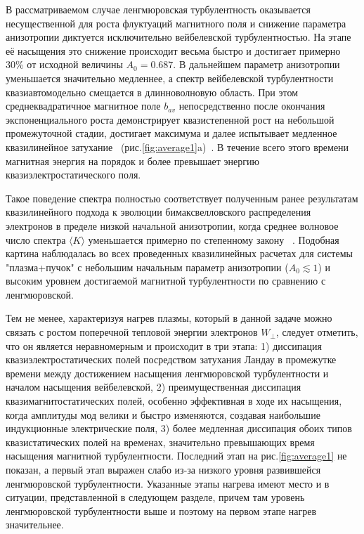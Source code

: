 В рассматриваемом случае ленгмюровская турбулентность оказывается несущественной для роста флуктуаций магнитного поля и снижение параметра анизотропии диктуется исключительно вейбелевской турбулентностью. На этапе её насыщения это снижение происходит весьма быстро и достигает примерно 30\% от исходной величины $A_0=0.687$. В дальнейшем параметр анизотропии уменьшается значительно медленнее, а спектр вейбелевской турбулентности квазиавтомодельно смещается в длинноволновую область. При этом среднеквадратичное магнитное поле $b_{av}$ непосредственно после окончания экспоненциального роста демонстрирует квазистепенной рост на небольшой    промежуточной стадии, достигает максимума и далее испытывает медленное квазилинейное затухание ~(рис.\ref{fig:average1}a)~\cite{Kuznetsov2023}. В течение всего этого времени магнитная энергия на порядок и более превышает энергию квазиэлектростатического поля.

Такое поведение спектра полностью соответствует полученным ранее результатам квазилинейного подхода к эволюции бимаксвелловского распределения электронов в пределе низкой начальной анизотропии, когда среднее волновое число спектра $\langle K\rangle$ уменьшается примерно по степенному закону~\cite{Kuznetsov2023,Borodachev2016_Radiofiz} . Подобная картина наблюдалась во всех проведенных квазилинейных расчетах для системы "плазма+пучок" с небольшим начальным параметр анизотропии ($A_0\lesssim1$) и высоким уровнем достигаемой магнитной турбулентности по сравнению с ленгмюровской. 

Тем не менее, характеризуя нагрев плазмы, который в данной задаче можно связать с ростом поперечной тепловой энергии электронов $W_\perp$, следует отметить, что он является неравномерным и происходит в три этапа: 1) диссипация квазиэлектростатических полей посредством затухания Ландау в промежутке времени между достижением насыщения ленгмюровской турбулентности и началом насыщения вейбелевской, 2) преимущественная диссипация квазимагнитостатических полей, особенно эффективная в ходе их насыщения, когда амплитуды мод велики и быстро изменяются, создавая наибольшие индукционные электрические поля, 3) более медленная диссипация обоих типов квазистатических полей на временах, значительно превышающих время насыщения магнитной турбулентности. Последний этап на рис.\ref{fig:average1} не показан, а первый этап выражен слабо из-за низкого уровня развившейся ленгмюровской турбулентности. Указанные этапы нагрева имеют место и в ситуации, представленной в следующем разделе, причем там уровень ленгмюровской турбулентности выше и поэтому на первом этапе нагрев значительнее.


